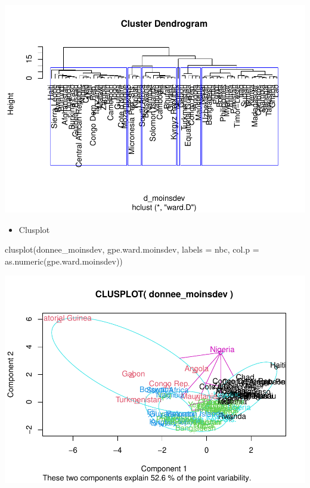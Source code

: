 \documentclass[
]{article}
\newenvironment{Shaded}{}{}
\newcommand{\AttributeTok}[1]{#1}
\newcommand{\FunctionTok}[1]{#1}
\newcommand{\NormalTok}[1]{#1}
\providecommand{\tightlist}{%
  \setlength{\itemsep}{0pt}\setlength{\parskip}{0pt}}
\begin{document}
\includegraphics{Projet_files/figure-latex/unnamed-chunk-34-1.pdf}

\begin{itemize}
\tightlist
\item
  Clusplot
\end{itemize}

\begin{Shaded}
\begin{Highlighting}[]
\FunctionTok{clusplot}\NormalTok{(donnee\_moinsdev, gpe.ward.moinsdev, }\AttributeTok{labels =}\NormalTok{ nbc, }\AttributeTok{col.p =} \FunctionTok{as.numeric}\NormalTok{(gpe.ward.moinsdev))}
\end{Highlighting}
\end{Shaded}

\includegraphics{Projet_files/figure-latex/unnamed-chunk-35-1.pdf}
\end{document}
